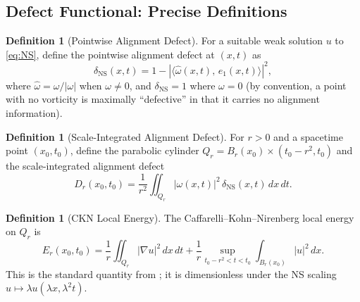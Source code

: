 \documentclass[11pt]{article}
\theoremstyle{definition}
\newtheorem{definition}[theorem]{Definition}
\theoremstyle{remark}
\begin{document}
\subsection{Defect Functional: Precise Definitions}

\begin{definition}[Pointwise Alignment Defect]
\label{def:pointwise-defect}
For a suitable weak solution $u$ to \eqref{eq:NS}, define the pointwise alignment
defect at $(x,t)$ as
\begin{equation}\label{eq:delta-NS}
  \delta_{\mathrm{NS}}(x,t) = 1 - |\langle \hat\omega(x,t),\, e_1(x,t)\rangle|^2,
\end{equation}
where $\hat\omega = \omega/|\omega|$ when $\omega \neq 0$, and
$\delta_{\mathrm{NS}} = 1$ where $\omega = 0$ (by convention, a point with no
vorticity is maximally ``defective'' in that it carries no alignment information).
\end{definition}

\begin{definition}[Scale-Integrated Alignment Defect]
\label{def:Dr}
For $r > 0$ and a spacetime point $(x_0, t_0)$, define the parabolic cylinder
$Q_r = B_r(x_0) \times (t_0 - r^2, t_0)$ and the scale-integrated alignment defect
\begin{equation}\label{eq:Dr}
  D_r(x_0, t_0) = \frac{1}{r^2}\iint_{Q_r} |\omega(x,t)|^2\,
  \delta_{\mathrm{NS}}(x,t)\, dx\, dt.
\end{equation}
\end{definition}

\begin{definition}[CKN Local Energy]
\label{def:Er}
The Caffarelli--Kohn--Nirenberg local energy on $Q_r$ is
\begin{equation}\label{eq:Er}
  E_r(x_0, t_0) = \frac{1}{r}\iint_{Q_r} |\nabla u|^2\, dx\, dt
  + \frac{1}{r}\sup_{t_0 - r^2 < t < t_0}\int_{B_r(x_0)} |u|^2\, dx.
\end{equation}
This is the standard quantity from \cite{CKN}; it is dimensionless under the
NS scaling $u \mapsto \lambda u(\lambda x, \lambda^2 t)$.
\end{definition}
\end{document}
